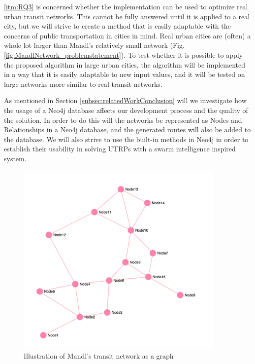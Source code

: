 \vref{itm:RQ3} is concerned whether the implementation can be used to optimize real urban transit networks. This cannot be fully answered until it is applied to a real city, but we will strive to create a method that is easily adaptable with the concerns of public transportation in cities in mind. Real urban cities are (often) a whole lot larger than Mandl's relatively small network (Fig. \vref{fig:MandlNetwork_problemstatement}). To  test whether it is possible to apply the proposed algorithm in large urban cities, the algorithm will be implemented in a way that it is easily adaptable to new input values, and it will be tested on large networks more similar to real transit networks. 

As mentioned in Section \vref{subsec:relatedWorkConclusion} will we investigate how the usage of a Neo4j database affects our development process and the quality of the solution. In order to do this will the networks be represented as Nodes and Relationships in a Neo4j database, and the generated routes will also be added to the database. We will also strive to use the built-in methods in Neo4j in order to establish their usability in solving UTRPs with a swarm intelligence inspired system. 



\begin{figure}[H]
\begin{center}
  \includegraphics[width=4in]{assets/mandlnetwork_crop.png}
  \end{center}
  \caption{Illustration of Mandl's transit network as a graph}
  \label{fig:MandlNetwork_problemstatement} 
\end{figure}







